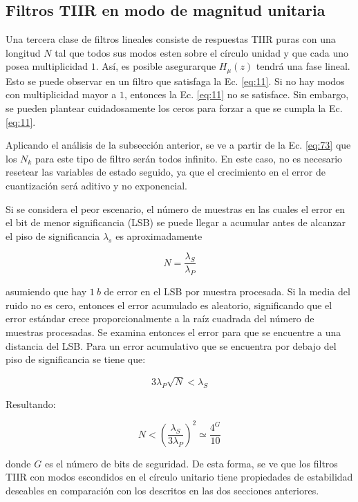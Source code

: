 \subsection{Filtros TIIR en modo de magnitud unitaria}
    Una tercera clase de filtros lineales consiste de respuestas TIIR puras con una longitud $N$ tal que todos sus modos esten sobre el círculo unidad y que cada uno posea multiplicidad $1$. Así, es posible asegurarque $H_{\mu}(z)$ tendrá una fase lineal. Esto se puede observar en un filtro que satisfaga la Ec. \ref{eq:11}. Si no hay modos con multiplicidad mayor a $1$, entonces la Ec. \ref{eq:11} no se satisface. Sin embargo, se pueden plantear cuidadosamente los ceros para forzar a que se cumpla la Ec. \ref{eq:11}.

    Aplicando el análisis de la subsección anterior, se ve a partir de la Ec. \ref{eq:73} que los $N_k$ para este tipo de filtro serán todos infinito. En este caso, no es necesario resetear las variables de estado seguido, ya que el crecimiento en el error de cuantización será aditivo y no exponencial.

    Si se considera el peor escenario, el número de muestras en las cuales el error en el bit de menor significancia (LSB) se puede llegar a acumular antes de alcanzar el piso de significancia $\lambda_s$ es aproximadamente

    \begin{equation}
      N = \frac{\lambda_S}{\lambda_P}
    \end{equation}

    asumiendo que hay $1 \: b$ de error en el LSB por muestra procesada. Si la media del ruido no es cero, entonces el error acumulado es aleatorio, significando que el error estándar crece proporcionalmente a la raíz cuadrada del número de muestras procesadas. Se examina entonces el error para que se encuentre a una distancia del LSB. Para un error acumulativo que se encuentra por debajo del piso de significancia se tiene que:

    \begin{equation}
      3 \lambda_P \sqrt{N} < \lambda_S
    \end{equation}

    Resultando:

    \begin{equation}
      N < \left( \frac{\lambda_S}{3 \lambda_P} \right)^2 \simeq \frac{4^G}{10}
    \end{equation}

    donde $G$ es el número de bits de seguridad. De esta forma, se ve que los filtros TIIR con modos escondidos en el círculo unitario tiene propiedades de estabilidad deseables en comparación con los descritos en las dos secciones anteriores.

